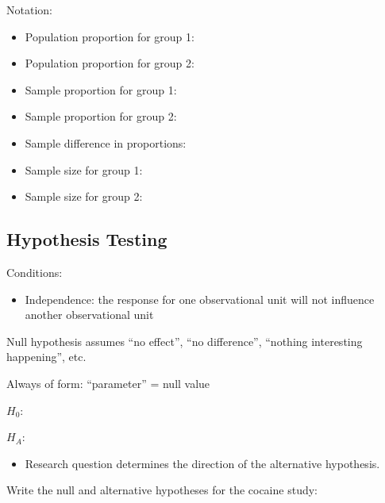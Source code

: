 \documentclass[
]{report}
\providecommand{\tightlist}{%
  \setlength{\itemsep}{0pt}\setlength{\parskip}{0pt}}
\newcommand{\rgi}{\hspace{24pt}}  %
\begin{document}
\vspace{0.15in}


Notation:

\begin{itemize}
\item
  Population proportion for group 1:
\item
  Population proportion for group 2:
\item
  Sample proportion for group 1:
\item
  Sample proportion for group 2:
\item
  Sample difference in proportions:
\item
  Sample size for group 1:
\item
  Sample size for group 2:
\end{itemize}


\subsection*{Hypothesis Testing}\label{hypothesis-testing-3}

Conditions:

\begin{itemize}
\tightlist
\item
  Independence: the response for one observational unit will not influence another observational unit
\end{itemize}

Null hypothesis assumes ``no effect'', ``no difference'', ``nothing interesting happening'', etc.

\rgi Always of form: ``parameter'' = null value

\(H_0:\)

\vspace{0.2in}

\(H_A:\)

\vspace{0.2in}

\begin{itemize}
\tightlist
\item
  Research question determines the direction of the alternative hypothesis.
\end{itemize}

\newpage

Write the null and alternative hypotheses for the cocaine study:
\end{document}
